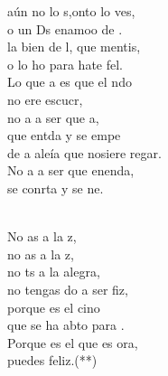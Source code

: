 \documentclass[12pt]{article}
\begin{document}
\begin{multicols*}{2}
\begin{cancion}%
	aún no lo s,onto lo ves, \\
	o un Ds enamoo de .\\
	la bien de l, que mentis, \\
	o lo ho para hate fel.\\
\jump
	Lo que a es que el ndo\\
	no ere escucr,\\
	no a a ser que a,\\
	que entda y se empe\\
	de a aleía que nosiere regar.\\
	No a a ser que enenda,\\
	se conrta y se ne.\\\jump\\
	\begin{chorus}%
	No as a la z,\\
	no as a la z,\\
	no ts a la alegra,\\
	no tengas do a ser fiz,\\
	porque  es el cino\\
	que se ha abto para .\\
	Porque  es el que es ora,\\
	puedes  feliz.(**)\\
	\end{chorus}%
	\jump\\
\end{cancion}%


\end{multicols*}
\end{document}
